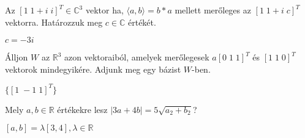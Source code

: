 \begin{frame}
  \begin{tcolorbox}[title={10/2. {\symrook}}]
    Az $[1 \; 1 + i \; i]^T \in \mathbb{C}^3$ vektor ha, ${\langle}a, b{\rangle} = b*a$ mellett merőleges az $[1 \; 1 + i \; c]^T$ vektorra. Határozzuk meg $c \in\mathbb{C}$ értékét.


  \tcblower

    \mmedskip 
    
    $c = -3i$
  \end{tcolorbox}
\end{frame}


\begin{frame}
  \begin{tcolorbox}[title={10/3. {\symrook}}]
    Álljon $W$ az $\mathbb{R}^3$ azon vektoraiból, amelyek merőlegesek $a[0 \; 1 \; 1]^T$ és $[1 \; 1 \; 0]^T$ vektorok mindegyikére. Adjunk meg egy bázist $W$-ben.

  \tcblower

    \mmedskip 
    
    $\{[1 \; -1 \; 1]^T\}$
  \end{tcolorbox}
\end{frame}


\begin{frame}
  \begin{tcolorbox}[title={10/4. {\symqueen}}]
    Mely $a,b \in \mathbb{R}$ értékekre lesz $|3a + 4b| = 5\sqrt{a_2 + b_2}$?

  \tcblower

    \mmedskip 
    
    $[a,b] = {\lambda}[3,4], {\lambda} \in \mathbb{R}$
  \end{tcolorbox}
\end{frame}


